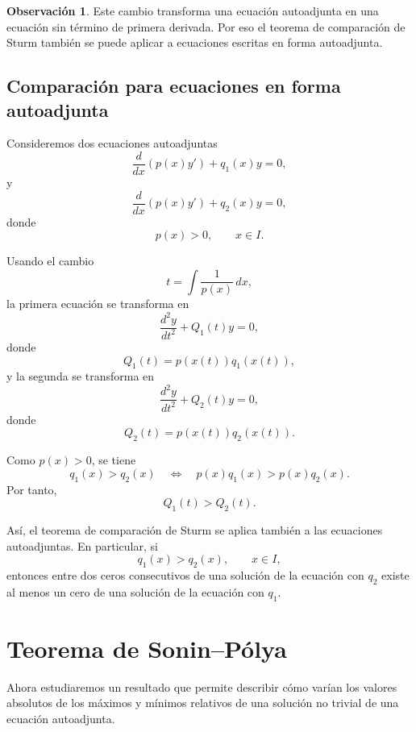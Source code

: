 \documentclass[12pt,a4paper]{article}
\theoremstyle{definition}
\newtheorem{observacion}[teorema]{Observación}
\begin{document}
\begin{observacion}
Este cambio transforma una ecuación autoadjunta en una ecuación sin término de primera derivada. Por eso el teorema de comparación de Sturm también se puede aplicar a ecuaciones escritas en forma autoadjunta.
\end{observacion}

\subsection{Comparación para ecuaciones en forma autoadjunta}

Consideremos dos ecuaciones autoadjuntas
\begin{equation}\label{eq:auto1}
\frac{d}{dx}\left(p(x)y'\right)+q_1(x)y=0,
\end{equation}
y
\begin{equation}\label{eq:auto2}
\frac{d}{dx}\left(p(x)y'\right)+q_2(x)y=0,
\end{equation}
donde
\[
p(x)>0,\qquad x\in I.
\]

Usando el cambio
\[
t=\int \frac{1}{p(x)}\,dx,
\]
la primera ecuación se transforma en
\[
\frac{d^2y}{dt^2}+Q_1(t)y=0,
\]
donde
\[
Q_1(t)=p(x(t))q_1(x(t)),
\]
y la segunda se transforma en
\[
\frac{d^2y}{dt^2}+Q_2(t)y=0,
\]
donde
\[
Q_2(t)=p(x(t))q_2(x(t)).
\]

Como \(p(x)>0\), se tiene
\[
q_1(x)>q_2(x)
\quad \Longleftrightarrow \quad
p(x)q_1(x)>p(x)q_2(x).
\]
Por tanto,
\[
Q_1(t)>Q_2(t).
\]

Así, el teorema de comparación de Sturm se aplica también a las ecuaciones autoadjuntas. En particular, si
\[
q_1(x)>q_2(x),\qquad x\in I,
\]
entonces entre dos ceros consecutivos de una solución de la ecuación con \(q_2\) existe al menos un cero de una solución de la ecuación con \(q_1\).

\section{Teorema de Sonin--Pólya}

Ahora estudiaremos un resultado que permite describir cómo varían los valores absolutos de los máximos y mínimos relativos de una solución no trivial de una ecuación autoadjunta.
\end{document}
